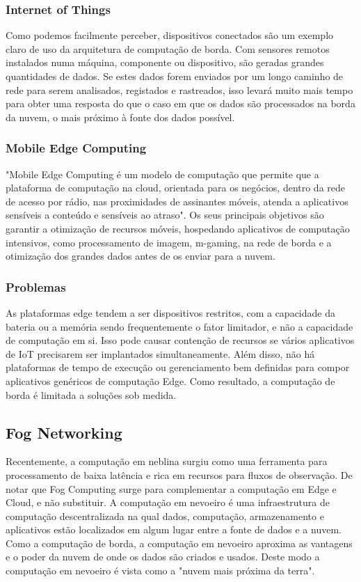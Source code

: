 \documentclass{llncs}
\begin{document}
\subsubsection{Internet of Things}
Como podemos facilmente perceber, dispositivos conectados são um exemplo claro de uso da arquitetura de computação de borda. Com sensores remotos instalados numa máquina, componente ou dispositivo, são geradas grandes quantidades de dados. Se estes dados forem enviados por um longo caminho de rede para serem analisados, registados e rastreados, isso levará muito mais tempo para obter uma resposta do que o caso em que os dados são processados na borda da nuvem, o mais próximo à fonte dos dados possível.\cite{1}

\subsubsection{Mobile Edge Computing}
"Mobile Edge Computing é um modelo de computação que permite que a plataforma de computação na cloud, orientada para os negócios, dentro da rede de acesso por rádio, nas proximidades de assinantes móveis, atenda a aplicativos sensíveis a conteúdo e sensíveis ao atraso".\cite{8}
Os seus principais objetivos são garantir a otimização de recursos móveis, hospedando aplicativos de computação intensivos, como processamento de imagem, m-gaming, na rede de borda e a otimização dos grandes dados antes de os enviar para a nuvem. \cite{8}

\subsubsection{Problemas}
As plataformas edge tendem a ser dispositivos restritos, com a capacidade da bateria ou a memória sendo frequentemente o fator limitador, e não a capacidade de computação em si. Isso pode causar contenção de recursos se vários aplicativos de IoT precisarem ser implantados simultaneamente.\cite{9} Além disso, não há plataformas de tempo de execução ou gerenciamento bem definidas para compor aplicativos genéricos de computação Edge. Como resultado, a computação de borda é limitada a soluções sob medida.\cite{10}

\subsection{Fog Networking}

Recentemente, a computação em neblina surgiu como uma ferramenta para processamento de baixa latência e rica em recursos para fluxos de observação.\cite{10} De notar que Fog Computing surge para complementar a computação em Edge e Cloud, e não substituir.
A computação em nevoeiro é uma infraestrutura de computação descentralizada na qual dados, computação, armazenamento e aplicativos estão localizados em algum lugar entre a fonte de dados e a nuvem. Como a computação de borda, a computação em nevoeiro aproxima as vantagens e o poder da nuvem de onde os dados são criados e usados.\cite{11} Deste modo a computação em nevoeiro é vista como a "nuvem mais próxima da terra".
\end{document}
